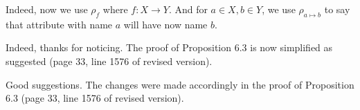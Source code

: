 \answer Indeed, now we use $\rho_f$ where $f\colon X\to Y$. And for $a\in X, b\in Y$, we use $\rho_{a\mapsto b}$ to say that attribute with name $a$ will have now name $b$.
\bigskip

\begin{comment}
	Comparison with $K$-Relations: The construction of algebra expression from MATLANG expressions is much more
	complicated than necessary. You should not do case distinctions on the types of
	matrices, as the general construction works independently of whether some
	dimension is 1 or not.
\end{comment}

\answer Indeed, thanks for noticing. The proof of Proposition 6.3 is now simplified as suggested (page 33, line 1576 of revised version).
\bigskip

\begin{comment}
	Comparison with $K$-Relations: Just use $Rel(S)(R_V) := \{row, col\}$ for every matrix $V$. row and col encode the domain of the indices of the matrix, as in your construction. The only
	difference is, that this domain could be the singleton $\{1\}$. And you should omit
	the subscripts alpha and beta of row and col. They are not needed, as the domain
	is encoded by the relation. If you omit the subscripts you will not need to
	talk about types at all in most parts of the proof. The soundness of the
	MATLANG expression ensures that the domains of row and col are correct.
	
	To always provide a col attribute you need a new relation $R_1$ with attribute
	col and a single number 1 inside the relation. You can then change $Q(v_p)$ to be
	$$
	\sigma_{row, \gamma_p} (\rho_{\alpha -> \gamma_p}(R_\alpha) \texttt{join} \rho_{\alpha ->
			row}(R_\alpha) \texttt{join} R_1)
	$$
	This construction simplifies the definition for transposition to just
	rename row $\rightarrow$ col and col $\rightarrow$ row. Also for the other operators you only need
	to talk about one case. And types are working flawlessly. E.g. matrix product
	becomes rename col $\rightarrow$ C for the first expression and row $\rightarrow$ C for the second
	expression before doing the join. However you have to explain what the join
	does, i.e., that it just computes the same sum as the matrix product.
\end{comment}

\answer Good suggestions. The changes were made accordingly in the proof of Proposition 6.3 (page 33, line 1576 of revised version).

